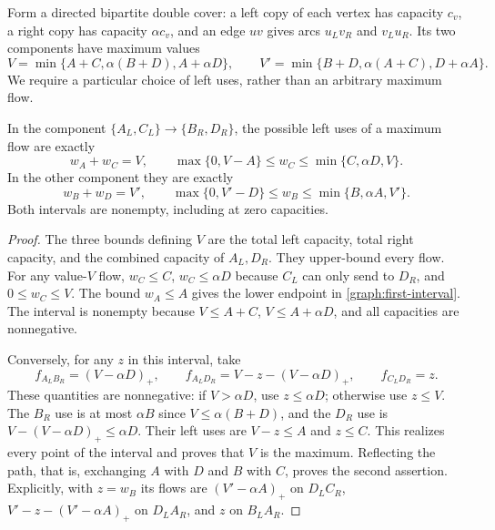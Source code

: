 Form a directed bipartite double cover: a left copy of each vertex has
capacity $c_v$, a right copy has capacity $\alpha c_v$, and an edge $uv$
gives arcs $u_Lv_R$ and $v_Lu_R$. Its two components have maximum values
\begin{equation}\label{graph:oriented-values}
 V=\min\{A+C,\alpha(B+D),A+\alpha D\},\qquad
 V'=\min\{B+D,\alpha(A+C),D+\alpha A\}.
\end{equation}
We require a particular choice of left uses, rather than an arbitrary
maximum flow.

\begin{lemma}\label{graph:flow-interval}
In the component $\{A_L,C_L\}\to\{B_R,D_R\}$, the possible left uses
of a maximum flow are exactly
\begin{equation}\label{graph:first-interval}
 w_A+w_C=V,\qquad
 \max\{0,V-A\}\le w_C\le\min\{C,\alpha D,V\}.
\end{equation}
In the other component they are exactly
\begin{equation}\label{graph:second-interval}
 w_B+w_D=V',\qquad
 \max\{0,V'-D\}\le w_B\le\min\{B,\alpha A,V'\}.
\end{equation}
Both intervals are nonempty, including at zero capacities.
\end{lemma}
\begin{proof}
The three bounds defining $V$ are the total left capacity, total right
capacity, and the combined capacity of $A_L,D_R$. They upper-bound every
flow. For any value-$V$ flow, $w_C\le C$, $w_C\le\alpha D$ because
$C_L$ can only send to $D_R$, and $0\le w_C\le V$.
The bound $w_A\le A$ gives the lower endpoint in
\eqref{graph:first-interval}. The interval is nonempty because
$V\le A+C$, $V\le A+\alpha D$, and all capacities are nonnegative.

Conversely, for any $z$ in this interval, take
\[
 f_{A_LB_R}=(V-\alpha D)_+,\qquad
 f_{A_LD_R}=V-z-(V-\alpha D)_+,\qquad f_{C_LD_R}=z.
\]
These quantities are nonnegative: if $V>\alpha D$, use $z\le\alpha D$;
otherwise use $z\le V$. The $B_R$ use is at most $\alpha B$ since
$V\le\alpha(B+D)$, and the $D_R$ use is
$V-(V-\alpha D)_+\le\alpha D$. Their left uses are $V-z\le A$ and
$z\le C$. This realizes every point of the interval and proves that $V$
is the maximum. Reflecting the path, that is, exchanging $A$ with $D$ and
$B$ with $C$, proves the second assertion. Explicitly, with $z=w_B$ its
flows are $(V'-\alpha A)_+$ on $D_LC_R$, $V'-z-(V'-\alpha A)_+$ on
$D_LA_R$, and $z$ on $B_LA_R$.
\end{proof}

